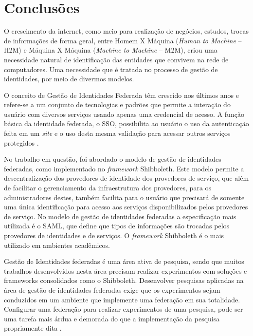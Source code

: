 \chapter{Conclusões}
\label{c_conclusao}

O crescimento da internet, como meio para realização de negócios, estudos, trocas de informações de forma geral, entre Homem X Máquina (\textit{Human to Machine} -- H2M) e Máquina X Máquina (\textit{Machine to Machine} -- M2M), criou uma necessidade natural de identificação das entidades que convivem na rede de computadores. Uma necessidade que é tratada no processo de gestão de identidades, por meio de divermos modelos.

O conceito de Gestão de Identidades Federada têm crescido nos últimos anos e refere-se a um conjunto de tecnologias e padrões que permite a interação do usuário com diversos serviços usando apenas uma credencial de acesso. A função básica da identidade federada, o SSO, possibilita ao usuário o uso da autenticação feita em um \textit{site} e o uso desta mesma validação para acessar outros serviços protegidos \cite{kallela:08}.

No trabalho em questão, foi abordado o modelo de gestão de identidades federadas, como implementado no \textit{framework} Shibboleth. Este modelo permite a descentralização dos provedores de identidade dos provedores de serviço, que além de facilitar o gerenciamento da infraestrutura dos provedores, para os administradores destes, também facilita para o usuário que precisará de somente uma única identificação para acesso aos serviços disponibilizados pelos provedores de serviço. No modelo de gestão de identidades federadas a especificação mais utilizada é o SAML, que define que tipos de informações são trocadas pelos provedores de identidades e de  serviços. O \textit{framework} Shibboleth é o mais utilizado em ambientes acadêmicos.

Gestão de Identidades federadas é uma área ativa de pesquisa, sendo que muitos trabalhos desenvolvidos nesta área precisam realizar experimentos com soluções e frameworks consolidados como o Shibboleth. Desenvolver pesquisas aplicadas na área de gestão de identidades federadas exige que os experimentos sejam conduzidos em um ambiente que implemente uma federação em sua totalidade. Configurar uma federação  para realizar experimentos de uma pesquisa, pode ser uma tarefa mais árdua e demorada do que a implementação da pesquisa propriamente dita \cite{wangham:13}.


